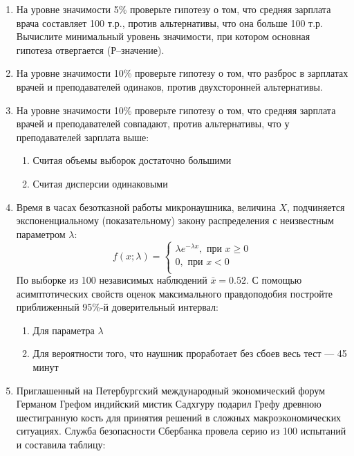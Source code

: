 \begin{enumerate}[resume]

	\item На уровне значимости 5\% проверьте гипотезу о том, что средняя зарплата врача составляет 100 т.р., против альтернативы, что она больше 100 т.р.  Вычислите минимальный уровень значимости, при котором основная гипотеза отвергается (Р–значение).

	\item На уровне значимости 10\% проверьте гипотезу о том, что разброс в зарплатах врачей и преподавателей одинаков, против двухсторонней альтернативы.

	\item На уровне значимости 10\% проверьте гипотезу о том, что средняя зарплата врачей и преподавателей совпадают, против альтернативы, что у преподавателей зарплата выше:

	\begin{enumerate}
	\item Считая объемы выборок достаточно большими
			\item Считая дисперсии одинаковыми
	 \end{enumerate}

			\item Время в часах безотказной работы  микронаушника, величина $X$, подчиняется экспоненциальному (показательному) закону распределения с неизвестным параметром $\lambda$:
\[
f(x;\lambda)
			=\begin{cases}
			\lambda e^{-\lambda x},\text{ при } x\geq0\\
			0, \text{ при }  x<0\\
			\end{cases}
\]
По выборке из 100 независимых наблюдений $\bar x=0.52$. С помощью асимптотических свойств оценок максимального правдоподобия постройте приближенный 95\%-й доверительный интервал:

\begin{enumerate}
	\item Для параметра $\lambda$
			\item Для вероятности того, что наушник проработает без сбоев весь тест — 45 минут
	 \end{enumerate}

	 \item Приглашенный на Петербургский международный экономический форум Германом Грефом индийский мистик Садхгуру подарил Грефу древнюю шестигранную кость для принятия решений в сложных макроэкономических ситуациях. Служба безопасности Сбербанка провела серию из 100 испытаний и составила таблицу:


\end{enumerate}

